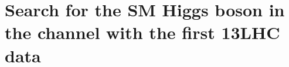 \chapter{Search for the SM Higgs boson in the \hww channel with the first 13\TeV LHC data}\label{chap5}
\thispagestyle{empty}







